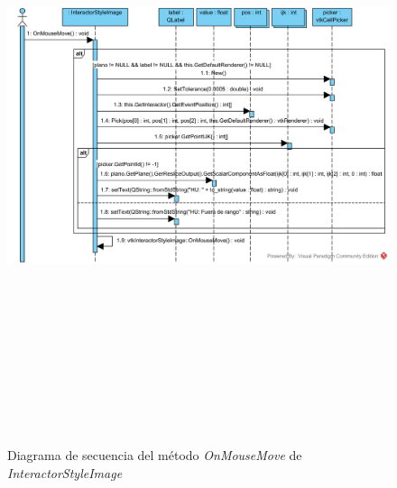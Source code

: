\begin{figure}[H]
	\centering
	\includegraphics[angle=90,height=18cm]{imagenes/diagramas/secuencia/InteractorStyleImage_OnMouseMove}
	\caption{Diagrama de secuencia del método \textit{OnMouseMove} de \textit{InteractorStyleImage}}
	\label{fig:diagrama_secuencia_interactorstyleimage_onmousemove}
\end{figure}